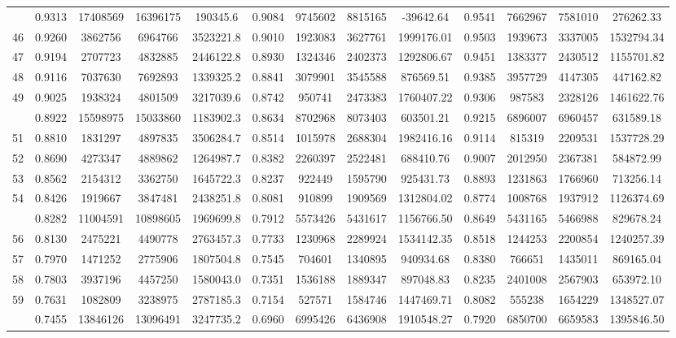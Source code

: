 \documentclass[
  12pt,
]{article}
\begin{document}
\begin{longtable}[t]{lcccccccccccc}
\addlinespace
45 & 0.9313 & 17408569 & 16396175 & 190345.6 & 0.9084 & 9745602 & 8815165 & -39642.64 & 0.9541 & 7662967 & 7581010 & 276262.33\\
46 & 0.9260 & 3862756 & 6964766 & 3523221.8 & 0.9010 & 1923083 & 3627761 & 1999176.01 & 0.9503 & 1939673 & 3337005 & 1532794.34\\
47 & 0.9194 & 2707723 & 4832885 & 2446122.8 & 0.8930 & 1324346 & 2402373 & 1292806.67 & 0.9451 & 1383377 & 2430512 & 1155701.82\\
48 & 0.9116 & 7037630 & 7692893 & 1339325.2 & 0.8841 & 3079901 & 3545588 & 876569.51 & 0.9385 & 3957729 & 4147305 & 447162.82\\
49 & 0.9025 & 1938324 & 4801509 & 3217039.6 & 0.8742 & 950741 & 2473383 & 1760407.22 & 0.9306 & 987583 & 2328126 & 1461622.76\\
\addlinespace
50 & 0.8922 & 15598975 & 15033860 & 1183902.3 & 0.8634 & 8702968 & 8073403 & 603501.21 & 0.9215 & 6896007 & 6960457 & 631589.18\\
51 & 0.8810 & 1831297 & 4897835 & 3506284.7 & 0.8514 & 1015978 & 2688304 & 1982416.16 & 0.9114 & 815319 & 2209531 & 1537728.29\\
52 & 0.8690 & 4273347 & 4889862 & 1264987.7 & 0.8382 & 2260397 & 2522481 & 688410.76 & 0.9007 & 2012950 & 2367381 & 584872.99\\
53 & 0.8562 & 2154312 & 3362750 & 1645722.3 & 0.8237 & 922449 & 1595790 & 925431.73 & 0.8893 & 1231863 & 1766960 & 713256.14\\
54 & 0.8426 & 1919667 & 3847481 & 2438251.8 & 0.8081 & 910899 & 1909569 & 1312804.02 & 0.8774 & 1008768 & 1937912 & 1126374.69\\
\addlinespace
55 & 0.8282 & 11004591 & 10898605 & 1969699.8 & 0.7912 & 5573426 & 5431617 & 1156766.50 & 0.8649 & 5431165 & 5466988 & 829678.24\\
56 & 0.8130 & 2475221 & 4490778 & 2763457.3 & 0.7733 & 1230968 & 2289924 & 1534142.35 & 0.8518 & 1244253 & 2200854 & 1240257.39\\
57 & 0.7970 & 1471252 & 2775906 & 1807504.8 & 0.7545 & 704601 & 1340895 & 940934.68 & 0.8380 & 766651 & 1435011 & 869165.04\\
58 & 0.7803 & 3937196 & 4457250 & 1580043.0 & 0.7351 & 1536188 & 1889347 & 897048.83 & 0.8235 & 2401008 & 2567903 & 653972.10\\
59 & 0.7631 & 1082809 & 3238975 & 2787185.3 & 0.7154 & 527571 & 1584746 & 1447469.71 & 0.8082 & 555238 & 1654229 & 1348527.07\\
\addlinespace
60 & 0.7455 & 13846126 & 13096491 & 3247735.2 & 0.6960 & 6995426 & 6436908 & 1910548.27 & 0.7920 & 6850700 & 6659583 & 1395846.50\\

\end{longtable}
\end{document}
